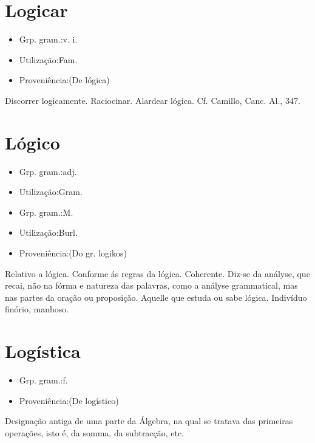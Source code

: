\section{Logicar}
\begin{itemize}
\item {Grp. gram.:v. i.}
\end{itemize}
\begin{itemize}
\item {Utilização:Fam.}
\end{itemize}
\begin{itemize}
\item {Proveniência:(De \textunderscore lógica\textunderscore )}
\end{itemize}
Discorrer logicamente.
Raciocinar.
Alardear lógica. Cf. Camillo, \textunderscore Canc. Al.\textunderscore , 347.
\section{Lógico}
\begin{itemize}
\item {Grp. gram.:adj.}
\end{itemize}
\begin{itemize}
\item {Utilização:Gram.}
\end{itemize}
\begin{itemize}
\item {Grp. gram.:M.}
\end{itemize}
\begin{itemize}
\item {Utilização:Burl.}
\end{itemize}
\begin{itemize}
\item {Proveniência:(Do gr. \textunderscore logikos\textunderscore )}
\end{itemize}
Relativo a lógica.
Conforme ás regras da lógica.
Coherente.
Diz-se da anályse, que recai, não na fórma e natureza das palavras, como a anályse grammatical, mas nas partes da oração ou proposição.
Aquelle que estuda ou sabe lógica.
Indivíduo finório, manhoso.
\section{Logística}
\begin{itemize}
\item {Grp. gram.:f.}
\end{itemize}
\begin{itemize}
\item {Proveniência:(De \textunderscore logístico\textunderscore )}
\end{itemize}
Designação antiga de uma parte da Álgebra, na qual se tratava das primeiras operações, isto é, da somma, da subtracção, etc.
